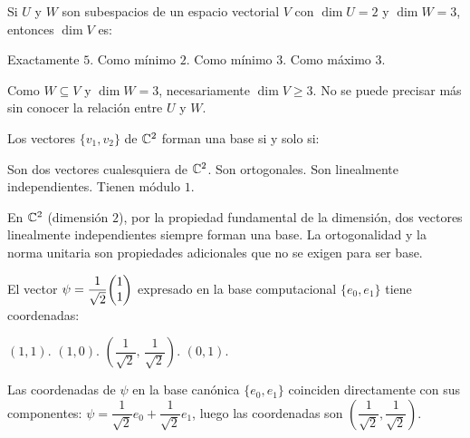 \begin{questions}
  \question Si $U$ y $W$ son subespacios de un espacio vectorial $V$ con $\dim U = 2$ y $\dim W = 3$, entonces $\dim V$ es:

  \begin{choices}
    \choice Exactamente $5$.
    \choice Como mínimo $2$.
    \CorrectChoice Como mínimo $3$.
    \choice Como máximo $3$.
  \end{choices}
  \begin{solution}
    Como $W\subseteq V$ y $\dim W=3$, necesariamente $\dim V\geq 3$.  No se puede precisar más sin conocer la relación entre $U$ y $W$.
  \end{solution}

  \question Los vectores $\{v_1,v_2\}$ de $\mathbb{C}^2$ forman una base si y solo si:

  \begin{choices}
    \choice Son dos vectores cualesquiera de $\mathbb{C}^2$.
    \choice Son ortogonales.
    \CorrectChoice Son linealmente independientes.
    \choice Tienen módulo $1$.
  \end{choices}
  \begin{solution}
    En $\mathbb{C}^2$ (dimensión $2$), por la propiedad fundamental de la dimensión, dos vectores linealmente independientes siempre forman una base. La ortogonalidad y la norma unitaria son propiedades adicionales que no se exigen para ser base.
  \end{solution}


  \question El vector $\psi = \dfrac{1}{\sqrt{2}}\mqty(1\\1)$ expresado en la base computacional $\{e_0,e_1\}$ tiene coordenadas:

  \begin{choices}
    \choice $(1,1)$.
    \choice $(1,0)$.
    \CorrectChoice $\left(\dfrac{1}{\sqrt{2}},\,\dfrac{1}{\sqrt{2}}\right)$.
    \choice $(0,1)$.
  \end{choices}
  \begin{solution}
    Las coordenadas de $\psi$ en la base canónica $\{e_0,e_1\}$ coinciden directamente con sus componentes: $\psi = \dfrac{1}{\sqrt{2}}e_0+\dfrac{1}{\sqrt{2}}e_1$, luego las coordenadas son $\left(\dfrac{1}{\sqrt{2}},\dfrac{1}{\sqrt{2}}\right)$.
  \end{solution}


\end{questions}
